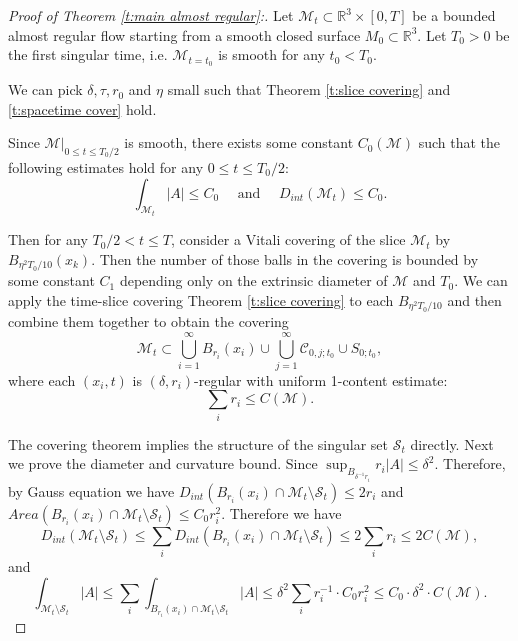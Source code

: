 \documentclass[11pt,reqno]{amsart}
\numberwithin{equation}{section}
\newcommand{\RR}{\mathds{R}}
\newcommand{\cC}{\mathcal{C}}
\newcommand{\cM}{\mathcal{M}}
\newcommand{\cS}{\mathcal{S}}
\theoremstyle{definition}
\theoremstyle{remark}
\theoremstyle{remark}
\theoremstyle{remark}
\theoremstyle{remark}\newtheorem{conjecture}[equation]{Conjecture}
\theoremstyle{remark}\newtheorem{question}[equation]{Question}
\begin{document}
\begin{proof}[Proof of Theorem \ref{t:main almost regular}:]

Let $\cM_{t} \subset \RR^3 \times [0,T]$ be a bounded almost regular flow starting from a smooth closed surface $M_0 \subset \RR^3$. Let $T_0>0$ be the first singular time, i.e. $\cM_{t=t_0}$ is smooth for any $t_0 < T_0$. 

We can pick $\delta,\tau,r_0$ and $\eta$ small such that Theorem \ref{t:slice covering} and \ref{t:spacetime cover} hold. 

Since $\cM|_{0\le t \le T_0/2}$ is smooth, there exists some constant $C_0(\cM)$ such that the following estimates hold for any $0\le t \le T_0/2$:
\begin{equation}
    \int_{\cM_t} |A|  \le C_0 \quad \text{ and } \quad D_{int}(\cM_t) \le C_0.
\end{equation}

Then for any $T_0/2 < t \le T$, consider a Vitali covering of the slice $\cM_t$ by $B_{\eta^2 T_0/10}(x_k)$. Then the number of those balls in the covering is bounded by some constant $C_1$ depending only on the extrinsic diameter of $\cM$ and $T_0$. We can apply the time-slice covering Theorem \ref{t:slice covering} to each $B_{\eta^2T_0/10}$ and then combine them together to obtain the covering
\begin{equation*}
    \cM_t \subset \bigcup_{i=1}^{\infty} B_{r_i}(x_i) \cup \bigcup_{j=1}^{\infty} \cC_{0,j;t_0} \cup S_{0;t_0},
\end{equation*}
where each $(x_i,t)$ is $(\delta,r_i)$-regular with uniform 1-content estimate: 
\begin{equation*}
    \sum_i r_i \le C(\cM).
\end{equation*}

The covering theorem implies the structure of the singular set $\cS_t$ directly. Next we prove the diameter and curvature bound. Since $\sup_{B_{\delta^{-1}r_i}} r_i|A| \le \delta^2$. Therefore, by Gauss equation we have $D_{int}(B_{r_i}(x_i) \cap \cM_t \setminus\cS_t) \le 2 r_i$ and $Area(B_{r_i}(x_i) \cap \cM_t \setminus \cS_t) \le C_0 r_i^2$. Therefore we have
\begin{equation*}
    D_{int}(\cM_t \setminus\cS_t) \le \sum_i D_{int}(B_{r_i}(x_i) \cap \cM_t \setminus\cS_t) \le 2\sum_i r_i \le 2 C(\cM),
\end{equation*}
and
\begin{equation*}
    \int_{\cM_t\setminus\cS_t} |A| \le \sum_i \int_{B_{r_i}(x_i) \cap \cM_t \setminus \cS_t} |A| \le \delta^2 \sum_i r_i^{-1} \cdot C_0r_i^2 \le C_0 \cdot \delta^2 \cdot C(\cM).
\end{equation*}


\end{proof}
\end{document}
